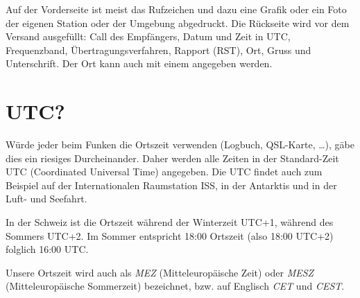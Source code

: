 Auf der Vorderseite ist meist das Rufzeichen und dazu eine Grafik oder ein Foto der eigenen Station oder der Umgebung abgedruckt. Die Rückseite wird vor dem Versand ausgefüllt: Call des Empfängers, Datum und Zeit in UTC, Frequenzband, Übertragungsverfahren, Rapport (RST), Ort, Gruss und Unterschrift. Der Ort kann auch mit einem  angegeben werden.

\section{UTC?}\label{sec:utc}
Würde jeder beim Funken die Ortszeit verwenden (Logbuch, QSL-Karte, …), gäbe dies ein riesiges Durcheinander. Daher werden alle Zeiten in der Standard-Zeit UTC (Coordinated Universal Time) angegeben. Die UTC findet auch zum Beispiel auf der Internationalen Raumstation ISS, in der Antarktis und in der Luft- und Seefahrt.

In der Schweiz ist die Ortszeit während der Winterzeit UTC+1, während des Sommers UTC+2. Im Sommer entspricht 18:00 Ortszeit (also 18:00 UTC+2) folglich 16:00 UTC.

Unsere Ortszeit wird auch als \textit{MEZ} (Mitteleuropäische Zeit) oder \textit{MESZ} (Mitteleuropäische Sommer­zeit) bezeichnet, bzw. auf Englisch \textit{CET} und \textit{CEST}.